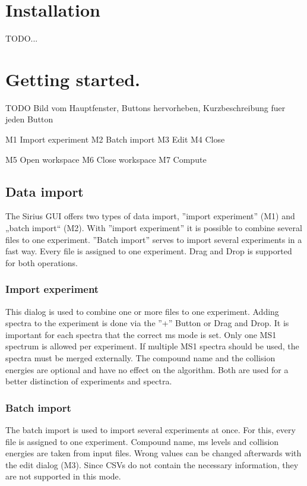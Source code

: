 \documentclass[a4paper,11pt]{article}
\begin{document}
 
 \tableofcontents
 
 \newpage
  
 \section{Installation}
 
 TODO...
 
 \section{Getting started.}
 
 TODO Bild vom Hauptfenster, Buttons hervorheben, Kurzbeschreibung fuer jeden Button
 
 M1 Import experiment
 M2 Batch import
 M3 Edit
 M4 Close
 
 M5 Open workspace
 M6 Close workspace
 M7 Compute 
 
 \subsection{Data import}
 
 The Sirius GUI offers two types of data import, ''import experiment'' (M1) and „batch import“ (M2). 
 With ''import experiment'' it is possible to combine  several files to one experiment. 
 ''Batch import'' serves to import several experiments in a fast way. Every file is assigned to one experiment. 
 Drag and Drop is supported for both operations.
 
 \subsubsection{Import experiment}
 
 This dialog is used to combine one or more files to one experiment. Adding spectra to the experiment is done via 
 the ''+'' Button or Drag and Drop. It is important for each spectra that the correct ms mode is set.  
 Only one MS1 spectrum is allowed per experiment. If multiple MS1 spectra should be used, the spectra must be merged externally.  
 The compound name and the collision energies are optional and have no effect on the algorithm. 
 Both are used  for a better distinction of experiments and spectra. 
 
 \subsubsection{Batch import}
 
 The batch import is used to import several experiments at once. For this, every file is assigned to one experiment. 
 Compound name, ms levels and collision energies are taken from input files. Wrong values can be changed afterwards with the edit dialog (M3).  
 Since CSVs do not contain the necessary information, they are not supported in this mode.
 
\end{document}
